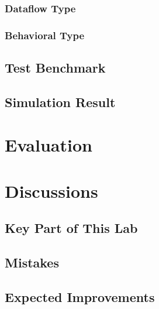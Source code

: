 \documentclass{report}
\begin{document}
            \subsection{Dataflow Type}
            \subsection{Behavioral Type}
        \section{Test Benchmark}
        \section{Simulation Result}
    \chapter{Evaluation}

    \chapter{Discussions}
        \section{Key Part of This Lab}
        \section{Mistakes}
        \section{Expected Improvements}
\end{document}
